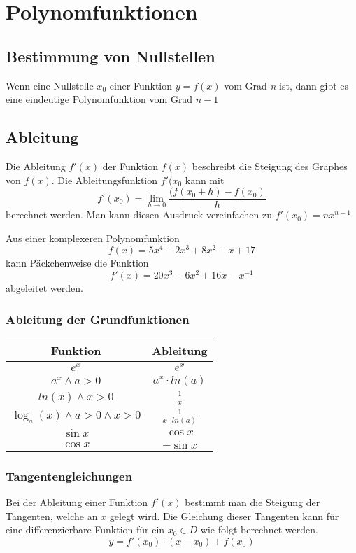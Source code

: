 \documentclass{article}
\author{Philipp Kiss}
\begin{document}
\tableofcontents
\newpage

\section{Polynomfunktionen}
\subsection{Bestimmung von Nullstellen}
Wenn eine Nullstelle \(x_0\) einer Funktion \(y = f(x)\) vom Grad \textit{n} ist, dann gibt es eine eindeutige Polynomfunktion vom Grad \(n-1\)
\subsection{Ableitung}
Die Ableitung \(f'(x)\) der Funktion \(f(x)\) beschreibt die Steigung des Graphes von \(f(x)\). Die Ableitungsfunktion \(f'(x_0\) kann mit \[f'(x_0)= \lim_{h \to 0} \frac{(f(x_0 + h) - f(x_0)}{h} \]
berechnet werden. Man kann diesen Ausdruck vereinfachen zu \(f'(x_0) = nx^{n-1}\)

Aus einer komplexeren Polynomfunktion \[
		f(x) = 5x^4-2x^3+8x^2-x+17
\]
kann Päckchenweise die Funktion \[
		f'(x) = 20x^3-6x^2+16x-x^{-1}
\] abgeleitet werden.
\subsubsection{Ableitung der Grundfunktionen}
\begin{table}[h!]
		\begin{center}
				\begin{tabular}{c|c}
						\textbf{Funktion} & \textbf{Ableitung} \\
						\hline
						$e^{x}$ & $e^{x}$\\
						\hline
						$a^{x} \land a > 0$ & $a^{x} \cdot ln(a)$\\
						\hline
						$ln(x) \land x > 0$ & $ \frac{1}{x} $ \\
						\hline
						$ \log_{a}(x) \land a > 0 \land x > 0$ & $ \frac{1}{x\cdot ln(a)} $\\
						\hline
						$\sin x$ & $\cos x$ \\
						\hline
						$\cos x$ & $- \sin x$
				\end{tabular}
		\end{center}
\end{table}
\subsubsection{Tangentengleichungen}
Bei der Ableitung einer Funktion $f'(x)$ bestimmt man die Steigung der Tangenten, welche an $x$ gelegt wird. Die Gleichung dieser Tangenten kann für eine differenzierbare Funktion für ein $x_0 \in D$ wie folgt berechnet werden.
$$y = f'(x_0) \cdot (x-x_0) +f(x_0)$$
\end{document}

